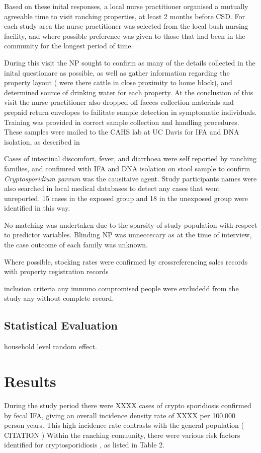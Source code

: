 \documentclass[12pt]{article}
\begin{document}
		Based on these inital responses, a local nurse practitioner organised a mutually agreeable time to visit ranching properties, at least 2 months before CSD.	%
		For each study area the nurse practitioner was selected from the local bush nursing facility, and where possible preference was given to those that had been in the community for the longest period of time.


		During this visit the NP sought to confirm as many of the details collected in the inital questionare as possible, as well as gather information regarding the property layout ( were there cattle in close proximity to home block), and determined source of drinking water for each property.
		At the conclustion of this visit the nurse practitioner also dropped off faeces collection materials and prepaid return envelopes to failitate sample detection in symptomatic individuals. 		%
		Training was provided in correct sample collection and handling procedures.
		These samples were mailed to the CAHS lab at UC Davis for IFA and DNA isolation,  as described in \cite{Atwill1999}
		

		Cases of intestinal discomfort, fever, and diarrhoea were self reported by ranching families, and confimred with IFA and DNA isolation on stool sample to confirm \emph{Cryptosporidium parvum} was the causitaive agent.
		Study participants names were also searched in local medical databases to detect any cases that went unreported. 15 cases in the exposed group and 18 in the unexposed group were identified in this way. 
		
		No matching was undertaken due to the sparsity of study population with respect to predictor variables. Blinding NP was unneccecary as at the time of interview, the case outcome of each family was unknown.


		Where possible, stocking rates were confirmed by crossreferencing sales records with property registration records
		
		inclusion criteria
			any immuno compromised people were excludedd from the study
			any without complete record.

	\subsection{Statistical Evaluation}
		household level random effect.

	\section{Results}
		During the study period there were XXXX cases of crypto sporidiosis confirmed by fecal IFA, giving an overall incidence density rate of XXXX per 100,000 person years. 
		This high incidence rate contrasts with the general population ( CITATION ) 
		Within the ranching comuunity, there were various risk factors identified for cryptosporidiosis , as listed in Table 2. 
\end{document}
